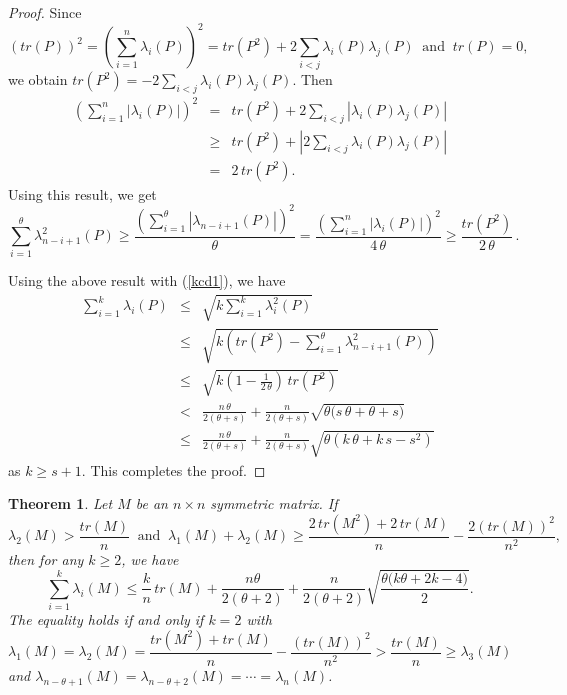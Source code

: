\documentclass[12pt]{article}
\newtheorem{theorem}{Theorem}[section]
\begin{document}
\begin{proof}
\vspace*{3mm}

Since
   $$(tr(P))^2=\left(\sum_{i=1}^{n}\lambda_i(P)\right)^2=tr(P^2)+2\sum_{i<j}\lambda_i(P)\lambda_j(P)~\mbox{ and }~tr(P)=0,$$ 
we obtain
   $tr(P^2)=-2\sum_{i<j}\lambda_i(P)\lambda_j(P)$.
Then 
    \begin{eqnarray}
 \left(\sum_{i=1}^{n}|\lambda_i(P)|\right)^2&=& tr(P^2)+2\sum_{i<j}|\lambda_i(P)\lambda_j(P)|\nonumber\\[2mm]
 &\geq &  tr(P^2)+\left|2\sum_{i<j}\lambda_i(P)\lambda_j(P)\right|\nonumber\\[2mm]
 &=&  2\,tr(P^2).\nonumber
 \end{eqnarray}
 \noindent
 Using this result, we get
  \begin{equation}
\sum_{i=1}^{\theta}\lambda_{n-i+1}^2(P)\geq
\frac{\left(\sum\limits_{i=1}^{\theta}|\lambda_{n-i+1}(P)|\right)^2}{\theta}=
\frac{\left(\sum\limits_{i=1}^{n}|\lambda_{i}(P)|\right)^2}{4\,\theta}\geq
\frac{tr(P^2)}{2\,\theta}\,.\label{e7}
 \end{equation}

 \vspace*{3mm}

 \noindent
 Using the above result with (\ref{kcd1}), we have
 \begin{eqnarray}
 \sum_{i=1}^{k}\lambda_i(P)&\leq& \sqrt{k\sum_{i=1}^{k}\lambda_i^2(P)}\nonumber\\[3mm]
     &\leq& \sqrt{k\left(tr(P^2)-\sum_{i=1}^{\theta}\lambda_{n-i+1}^2(P)\right)} \nonumber\\[3mm]
     &\leq& \sqrt{k\left(1-\frac{1}{2\,\theta}\right)\,tr(P^2)}\nonumber\\[3mm]
     &<&\frac{n\,\theta}{2(\theta+s)}+\frac{n}{2(\theta+s)}\sqrt{\theta\big(s\,\theta+\theta+s\big)}\nonumber\\[3mm]
     &\leq & \frac{n\,\theta}{2(\theta+s)}+\frac{n}{2(\theta+s)}\sqrt{\theta(k\,\theta+k\,s-s^2)}\nonumber
 \end{eqnarray}
as $k\geq s+1$. This completes the proof.
\end{proof}

\begin{theorem} \label{th2} Let $M$ be an $n\times n$ symmetric matrix. If 
$$\lambda_2(M)> \frac{tr(M)}{n}~\mbox{ and }~\lambda_1(M)+\lambda_2(M)\geq \frac{2\,tr(M^2)+2\,tr(M)}{n}-\frac{2(tr(M))^2}{n^2},$$
then for any $k\geq 2$, we have
  \begin{equation}
 \sum_{i=1}^{k}\lambda_i(M)\leq\frac{k}{n}\,tr(M)+\frac{n\theta}{2(\theta+2)}+\frac{n}{2(\theta+2)}\sqrt{\frac{\theta\big(k\theta+2k-4\big)}{2}}.  \label{nne1}
 \end{equation}
 The equality holds if and only if $k=2$ with 
 $$\lambda_1(M)=\lambda_2(M)=\frac{tr(M^2)+tr(M)}{n}-\frac{(tr(M))^2}{n^2}>\frac{tr(M)}{n}\geq \lambda_{3}(M)$$
and $\lambda_{n-\theta+1}(M)=\lambda_{n-\theta+2}(M)=\cdots=\lambda_n(M)$.
 \end{theorem}
\end{document}
